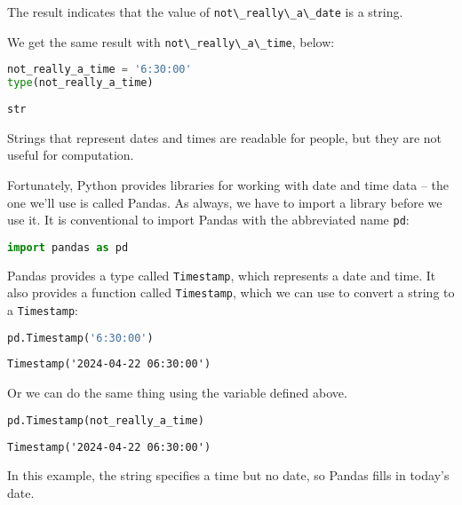 The result indicates that the value of
\passthrough{\lstinline!not\_really\_a\_date!} is a string.

We get the same result with
\passthrough{\lstinline!not\_really\_a\_time!}, below:

\begin{lstlisting}[language=Python,style=source]
not_really_a_time = '6:30:00'
type(not_really_a_time)
\end{lstlisting}

\begin{lstlisting}[style=output]
str
\end{lstlisting}

Strings that represent dates and times are readable for people, but they
are not useful for computation.

Fortunately, Python provides libraries for working with date and time
data -- the one we'll use is called Pandas. As always, we have to import
a library before we use it. It is conventional to import Pandas with the
abbreviated name \passthrough{\lstinline!pd!}:

\begin{lstlisting}[language=Python,style=source]
import pandas as pd
\end{lstlisting}

Pandas provides a type called \passthrough{\lstinline!Timestamp!}, which
represents a date and time. It also provides a function called
\passthrough{\lstinline!Timestamp!}, which we can use to convert a
string to a \passthrough{\lstinline!Timestamp!}:

\begin{lstlisting}[language=Python,style=source]
pd.Timestamp('6:30:00')
\end{lstlisting}

\begin{lstlisting}[style=output]
Timestamp('2024-04-22 06:30:00')
\end{lstlisting}

Or we can do the same thing using the variable defined above.

\begin{lstlisting}[language=Python,style=source]
pd.Timestamp(not_really_a_time)
\end{lstlisting}

\begin{lstlisting}[style=output]
Timestamp('2024-04-22 06:30:00')
\end{lstlisting}

In this example, the string specifies a time but no date, so Pandas
fills in today's date.

